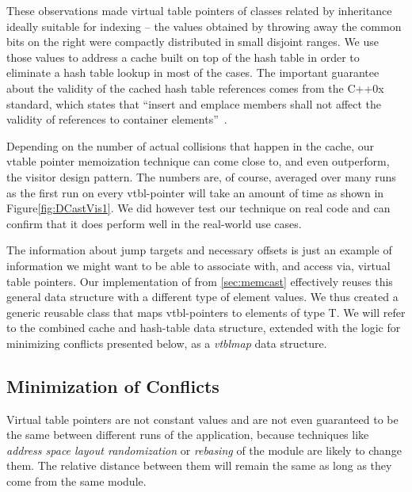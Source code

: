 These observations made virtual table pointers of classes related by inheritance 
ideally suitable for indexing -- the values obtained by throwing away the common 
bits on the right were compactly distributed in small disjoint ranges. We use 
those values to address a cache built on top of the hash table in order to 
eliminate a hash table lookup in most of the cases.  The important 
guarantee about the validity of the cached hash table references comes from the 
C++0x standard, which states that ``insert and emplace members shall not affect 
the validity of references to container elements''~\cite[.5(13)]{C++0x}. 

Depending on the number of actual collisions that happen in the cache, our 
vtable pointer memoization technique can come close to, and even outperform, the 
visitor design pattern. The numbers are, of course, averaged over many runs as 
the first run on every vtbl-pointer will take an amount of time as shown in 
Figure\ref{fig:DCastVis1}. We did however test our technique on real code and 
can confirm that it does perform well in the real-world use cases.

The information about jump targets and necessary offsets is just an example of 
information we might want to be able to associate with, and access via, virtual 
table pointers. Our implementation of  from 
\textsection\ref{sec:memcast} effectively reuses this general data structure with 
a different type of element values. We thus created a generic reusable class 
 that maps vtbl-pointers to elements of type T. We will refer 
to the combined cache and hash-table data structure, extended with the logic for 
minimizing conflicts presented below, as a \emph{vtblmap} data structure.

\subsection{Minimization of Conflicts}
\label{sec:moc}

Virtual table pointers are not constant values and are not even guaranteed to be 
the same between different runs of the application, because techniques like 
\emph{address space layout randomization} or \emph{rebasing} of the module are 
likely to change them. The relative distance between them will remain the same 
as long as they come from the same module.


